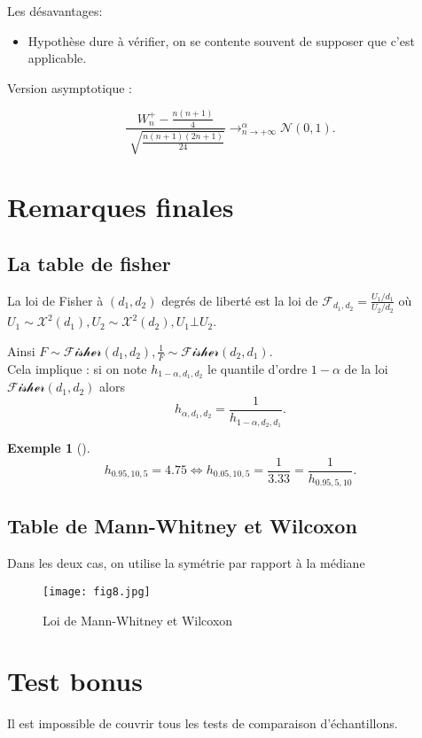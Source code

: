 \documentclass{article}
\theoremstyle{plain}%
\theoremstyle{definition}
\newtheorem{exmp}{Exemple}[section]
\theoremstyle{remark}
\begin{document}
Les désavantages:
\begin{itemize}
    \item Hypothèse dure à vérifier, on se contente souvent de supposer que c'est applicable.
\end{itemize}

Version asymptotique : 

\[
    \frac{W_n^+ - \frac{n(n+1)}{4}}{\sqrt[]{\frac{n(n+1)(2n+1)}{24}}} \to ^{\alpha }_{n \to +\infty }\mathcal{N}(0,1)
.\]

\section{Remarques finales}
\subsection{La table de fisher}
La loi de Fisher à $ (d_1, d_2) $ degrés de liberté est la loi de $ \mathcal{F}_{d_1, d_2} = \frac{U_1 / d_1}{U_2 / d_2} $ où $ U_1 \sim \mathcal{X}^2(d_1), U_2 \sim \mathcal{X}^2 (d_2), U_1 \bot U_2 $. 

Ainsi $ F \sim \mathcal{Fisher}(d_1, d_2), \frac{1}{F} \sim \mathcal{Fisher}(d_2, d_1) $.\\
Cela implique : si on note $ h_{1-\alpha , d_1, d_2} $ le quantile d'ordre $ 1 - \alpha  $ de la loi $ \mathcal{Fisher}(d_1, d_2) $ alors 
\[
    h_{\alpha, d_1, d_2} = \frac{1}{h_{1-\alpha, d_2, d_1}}
.\]
\begin{exmp}[]
    \[
        h_{0.95, 10, 5} = 4.75 \Leftrightarrow h_{0.05, 10, 5} = \frac{1}{3.33} = \frac{1}{h_{0.95, 5 ,10}}
    .\]
\end{exmp}

\subsection{Table de Mann-Whitney et Wilcoxon}
Dans les deux cas, on utilise la symétrie par rapport à la médiane 
\begin{figure}[!htbp]
    \centering
    \texttt{[image: fig8.jpg]}
    \caption{Loi de Mann-Whitney et Wilcoxon}
\end{figure}


\section{Test bonus}
Il est impossible de couvrir tous les tests de comparaison d'échantillons.
\end{document}
